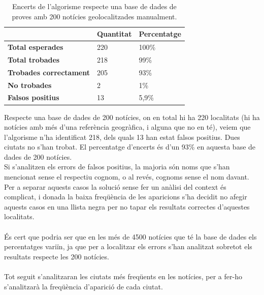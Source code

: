 \documentclass[12pt,a4paper,openright,oneside]{article}
\numberwithin{equation}{section}
\theoremstyle{definition}
\begin{document}
\begin{table}[!htbp]
\begin{center}
	\centering
    \begin{tabular}{| l | l | l |}
    \hline
    \textbf{} & \textbf{Quantitat} & \textbf{Percentatge}\\ \hline
    \textbf{Total esperades} & 220 & 100\% \\ \hline
    \textbf{Total trobades} & 218 & 99\%\\ \hline
    \textbf{Trobades correctament} & 205 & 93\%\\ \hline
    \textbf{No trobades} & 2 & 1\%\\ \hline
    \textbf{Falsos positius} & 13 & 5,9\%\\ \hline
    \end{tabular}
\end{center}
\caption{Encerts de l'algorisme respecte una base de dades de proves amb 200 notícies geolocalitzades manualment.}
\end{table}

Respecte una base de dades de 200 notícies, on en total hi ha 220 localitats (hi ha notícies amb més d'una referència geogràfica, i alguna que no en té), veiem que l'algorisme n'ha identificat 218, dels quals 13 han estat falsos positius. Dues ciutats no s'han trobat. El percentatge d'encerts és d'un 93\% en aquesta base de dades de 200 notícies.\\
Si s'analitzen els errors de falsos positius, la majoria són noms que s'han mencionat sense el respectiu cognom, o al revés, cognoms sense el nom davant. Per a separar aquests casos la solució sense fer un anàlisi del context és complicat, i donada la baixa freqüència de les aparicions s'ha decidit no afegir aquests casos en una llista negra per no tapar els resultats correctes d'aquestes localitats.\\\\
És cert que podria ser que en les més de 4500 notícies que té la base de dades els percentatges variïn, ja que per a localitzar els errors s'han analitzat sobretot els resultats respecte les 200 notícies.\\\\
\newpage
Tot seguit s'analitzaran les ciutats més freqüents en les notícies, per a fer-ho s'analitzarà la freqüència d'aparició de cada ciutat.\\
\end{document}
